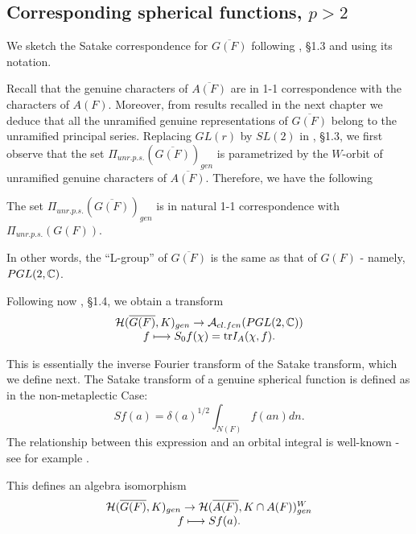 \subsection{Corresponding spherical functions, $p> 2$}

We sketch the Satake correspondence for $\overline{G(F)}$
following \cite{J}, \S 1.3 and using its notation.

Recall that the genuine characters of
$\overline{A(F)}$ are in 1-1 correspondence with
the characters of $A(F)$. Moreover, from results recalled in
the next chapter we deduce that all
the unramified genuine representations of
$\overline{G(F)}$ belong to the unramified principal series.
Replacing $GL(r)$ by
$SL(2)$ in \cite{J}, \S 1.3, we first observe that the
set $\Pi_{unr.p.s.}(\overline{G(F)})_{gen}$ is
parametrized by the $W$-orbit of unramified
genuine characters of $\overline{A(F)}$. Therefore, we have the following

\begin{lemma} The set $\Pi_{unr.p.s.}(\overline{G(F)})_{gen}$ is
in natural 1-1 correspondence with
$\Pi_{unr.p.s.}(G(F))$.
\end{lemma}

In other words, the ``L-group'' of $\overline{G(F)}$ is the
same as that of $G(F)$ - namely, $PGL(2,{\Bbb{C}})$.

Following now \cite{J}, \S 1.4, we obtain a transform
\begin{equation}
\begin{array}{c}
{\cal{H}}(\overline{G(F)},K)_{gen}\rightarrow
{\cal{A}}_{cl.fcn}(PGL(2,{\Bbb{C}}))\\
f\longmapsto S_0 f(\chi)={\rm tr}I_A(\chi,f).
\end{array}
\end{equation}

This is essentially the inverse Fourier transform of the Satake
transform, which we define next. The Satake transform of a
genuine spherical function is defined as in the non-metaplectic Case:
\begin{equation}
Sf(a)=\delta(a)^{1/2}\int_{N(F)}f(an)dn.
\end{equation}
The relationship between this expression and an orbital integral
is well-known - see for example \cite{C}.

This defines an algebra isomorphism
\begin{equation}
\begin{array}{c}
{\cal{H}}(\overline{G(F)},K)_{gen}\rightarrow
{\cal{H}}(\overline{A(F)},K\cap A(F))^W_{gen}\\
f\longmapsto Sf(a).
\end{array}
\end{equation}

